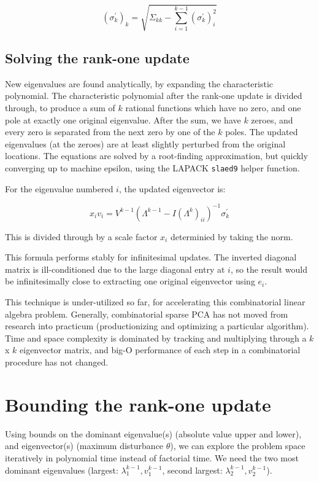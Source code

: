 \documentclass{article}
\begin{document}
$$
\left(\sigma_k^\prime\right)_k = \sqrt{\Sigma_{kk} - \sum_{i=1}^{k-1} \left(\sigma_k^\prime\right)_i^2}
$$

\subsection{Solving the rank-one update}

New eigenvalues are found analytically, by expanding the characteristic polynomial. The characteristic polynomial after the rank-one update is divided through, to produce a sum of $k$ rational functions which have no zero, and one pole at exactly one original eigenvalue. After the sum, we have $k$ zeroes, and every zero is separated from the next zero by one of the $k$ poles. The updated eigenvalues (at the zeroes) are at least slightly perturbed from the original locations. The equations are solved by a root-finding approximation, but quickly converging up to machine epsilon, using the LAPACK \texttt{slaed9} helper function.

For the eigenvalue numbered $i$, the updated eigenvector is:

$$x_i v_i = V^{k-1} (\Lambda^{k-1} - I \left(\Lambda^k\right)_{ii})^{-1} \sigma_k^\prime$$

This is divided through by a scale factor $x_i$ determinied by taking the norm.

This formula performs stably for infinitesimal updates. The inverted diagonal matrix is ill-conditioned due to the large diagonal entry at $i$, so the result would be infinitesimally close to extracting one original eigenvector using $e_i$.

This technique is under-utilized so far, for accelerating this combinatorial linear algebra problem. Generally, combinatorial sparse PCA has not moved from research into practicum (productionizing and optimizing a particular algorithm). Time and space complexity is dominated by tracking and multiplying through a $k$ x $k$ eigenvector matrix, and big-O performance of each step in a combinatorial procedure has not changed.

\section{Bounding the rank-one update}

Using bounds on the dominant eigenvalue(s) (absolute value upper and lower), and eigenvector(s) (maximum disturbance $\theta$), we can explore the problem space iteratively in polynomial time instead of factorial time. We need the two most dominant eigenvalues (largest: $\lambda^{k-1}_1, v^{k-1}_1$, second largest: $\lambda^{k-1}_2, v^{k-1}_2$).
\end{document}
